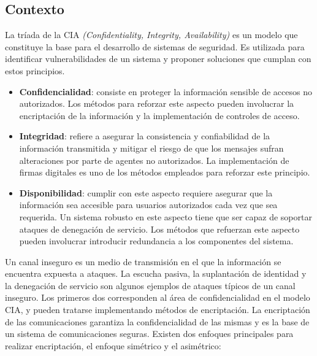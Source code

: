 \subsection{Contexto}

La tríada de la CIA \textit{(Confidentiality, Integrity, Availability)} es un modelo que constituye la base para el desarrollo de sistemas de seguridad. Es utilizada para identificar vulnerabilidades de un sistema y proponer soluciones que cumplan con estos principios. 
\begin{itemize}
    \item \textbf{Confidencialidad}: consiste en proteger la información sensible de accesos no autorizados. Los métodos para reforzar este aspecto pueden involucrar la encriptación de la información y la implementación de controles de acceso.
    \item \textbf{Integridad}: refiere a asegurar la consistencia y confiabilidad de la información transmitida y mitigar el riesgo de que los mensajes sufran alteraciones por parte de agentes no autorizados. La implementación de firmas digitales es uno de los métodos empleados para reforzar este principio.
    \item \textbf{Disponibilidad}: cumplir con este aspecto requiere asegurar que la información sea accesible para usuarios autorizados cada vez que sea requerida. Un sistema robusto en este aspecto tiene que ser capaz de soportar ataques de denegación de servicio. Los métodos que refuerzan este aspecto pueden involucrar introducir redundancia a los componentes del sistema.
\end{itemize}

Un canal inseguro es un medio de transmisión en el que la información se encuentra expuesta a ataques. La escucha pasiva, la suplantación de identidad y la denegación de servicio son algunos ejemplos de ataques típicos de un canal inseguro. Los primeros dos corresponden al área de confidencialidad en el modelo CIA, y pueden tratarse implementando métodos de encriptación.
La encriptación de las comunicaciones garantiza la confidencialidad de las mismas y es la base de un sistema de comunicaciones seguras. Existen dos enfoques principales para realizar encriptación, el enfoque simétrico y el asimétrico:

